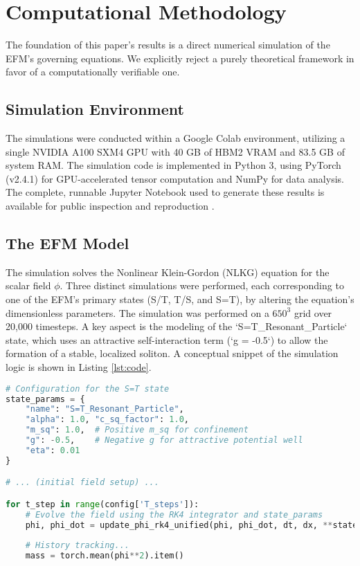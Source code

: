 \documentclass[11pt, twoside]{article}
\begin{document}
\section{Computational Methodology}
The foundation of this paper's results is a direct numerical simulation of the EFM's governing equations. We explicitly reject a purely theoretical framework in favor of a computationally verifiable one.

\subsection{Simulation Environment}
The simulations were conducted within a Google Colab environment, utilizing a single NVIDIA A100 SXM4 GPU with 40 GB of HBM2 VRAM and 83.5 GB of system RAM. The simulation code is implemented in Python 3, using PyTorch (v2.4.1) for GPU-accelerated tensor computation and NumPy for data analysis. The complete, runnable Jupyter Notebook used to generate these results is available for public inspection and reproduction \citep{efm_notebook_ref}.

\subsection{The EFM Model}
The simulation solves the Nonlinear Klein-Gordon (NLKG) equation for the scalar field \(\phi\). Three distinct simulations were performed, each corresponding to one of the EFM's primary states (S/T, T/S, and S=T), by altering the equation's dimensionless parameters. The simulation was performed on a \(650^3\) grid over 20,000 timesteps. A key aspect is the modeling of the `S=T_Resonant_Particle` state, which uses an attractive self-interaction term (`g = -0.5`) to allow the formation of a stable, localized soliton. A conceptual snippet of the simulation logic is shown in Listing \ref{lst:code}.

\begin{lstlisting}[language=Python, caption={Conceptual Simulation Snippet for the S=T State}, label={lst:code}, basicstyle=\ttfamily\scriptsize, frame=single, breaklines=true]
# Configuration for the S=T state
state_params = {
    "name": "S=T_Resonant_Particle",
    "alpha": 1.0, "c_sq_factor": 1.0, 
    "m_sq": 1.0,  # Positive m_sq for confinement
    "g": -0.5,    # Negative g for attractive potential well
    "eta": 0.01
}

# ... (initial field setup) ...

for t_step in range(config['T_steps']):
    # Evolve the field using the RK4 integrator and state_params
    phi, phi_dot = update_phi_rk4_unified(phi, phi_dot, dt, dx, **state_params)
    
    # History tracking...
    mass = torch.mean(phi**2).item() 
\end{lstlisting}
\end{document}
